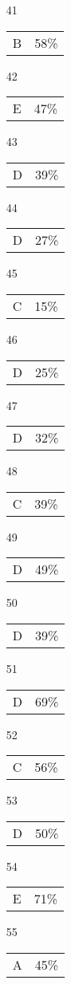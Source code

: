 \documentclass[12pt]{article}
\begin{document}
\begin{multicols}{5}
\begin{enumerate}
\item[41] \begin{tabular}{cc} B & 58\%\end{tabular}
\item[42] \begin{tabular}{cc} E & 47\%\end{tabular}
\item[43] \begin{tabular}{cc} D & 39\%\end{tabular}
\item[44] \begin{tabular}{cc} D & 27\%\end{tabular}
\item[45] \begin{tabular}{cc} C & 15\%\end{tabular}
\item[]
\item[46] \begin{tabular}{cc} D & 25\%\end{tabular}
\item[47] \begin{tabular}{cc} D & 32\%\end{tabular}
\item[48] \begin{tabular}{cc} C & 39\%\end{tabular}
\item[49] \begin{tabular}{cc} D & 49\%\end{tabular}
\item[50] \begin{tabular}{cc} D & 39\%\end{tabular}
\item[]
\item[51] \begin{tabular}{cc} D & 69\%\end{tabular}
\item[52] \begin{tabular}{cc} C & 56\%\end{tabular}
\item[53] \begin{tabular}{cc} D & 50\%\end{tabular}
\item[54] \begin{tabular}{cc} E & 71\%\end{tabular}
\item[55] \begin{tabular}{cc} A & 45\%\end{tabular}

\end{enumerate}
\end{multicols}
\end{document}
